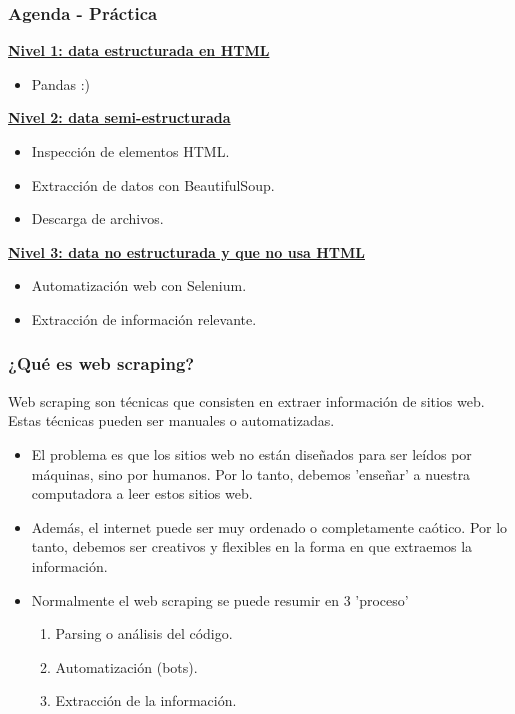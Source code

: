 \documentclass{beamer}
\begin{document}
\begin{frame}
	\frametitle{Agenda - Práctica}
	\underline{\textbf{Nivel 1: data estructurada en HTML}}
	\begin{itemize}
		\item Pandas :)
	\end{itemize}
	
	\underline{\textbf{Nivel 2: data semi-estructurada}}
	\begin{itemize}
		\item Inspección de elementos HTML.
		\item Extracción de datos con BeautifulSoup.
		\item Descarga de archivos.
	\end{itemize}

	\underline{\textbf{Nivel 3: data no estructurada y que no usa HTML}}
	\begin{itemize}
		\item Automatización web con Selenium.
		\item Extracción de información relevante.
	\end{itemize}
\end{frame}

\begin{frame}
	\frametitle{¿Qué es web scraping?}
	\begin{alertblock}{ }
		\centering
		Web scraping son técnicas que consisten en extraer información de sitios web. Estas técnicas pueden ser manuales o automatizadas.
	\end{alertblock}
	
	
	\begin{itemize}
		\item El problema es que los sitios web no están diseñados para ser leídos por máquinas, sino por humanos. Por lo tanto, debemos 'enseñar' a nuestra computadora a leer estos sitios web.  \\
		\item Además, el internet puede ser muy ordenado o completamente caótico. Por lo tanto, debemos ser creativos y flexibles en la forma en que extraemos la información.
		\item Normalmente el web scraping se puede resumir en 3 'proceso' \\
		\begin{enumerate}
			\item Parsing o análisis del código.
			\item Automatización (bots).
			\item Extracción de la información.
		\end{enumerate}
	\end{itemize}
\end{frame}
\end{document}
